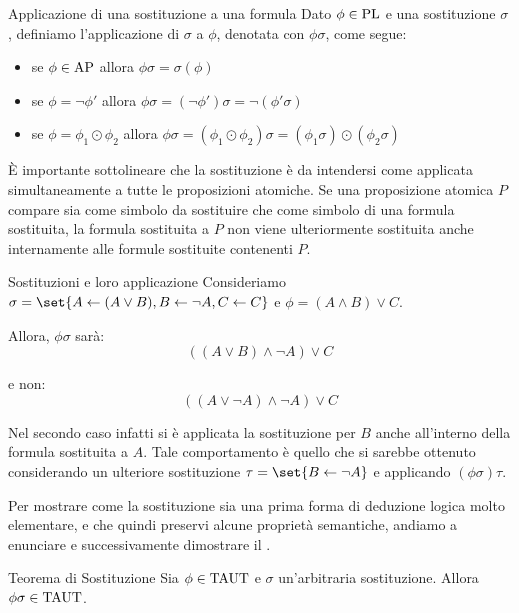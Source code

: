 \begin{definition}{Applicazione di una sostituzione a una formula}
  Dato \(\phi \in \operatorname{PL}\) e una sostituzione \(\sigma\), definiamo l'applicazione di \(\sigma\) a \(\phi\), denotata con \(\phi\sigma\), come segue:
  \begin{itemize}
   \item se \(\phi \in \AP\) allora \(\phi\sigma = \sigma(\phi)\)
   \item se \(\phi = \neg \phi'\) allora \(\phi\sigma = (\neg \phi ')\sigma = \neg (\phi'\sigma)\)
   \item se \(\phi = \phi_1 \odot \phi_2\) allora \(\phi\sigma = (\phi_1 \odot \phi_2)\sigma = (\phi_1\sigma) \odot (\phi_2\sigma)\)
  \end{itemize}
\end{definition}

\begin{note}{}
  È importante sottolineare che la sostituzione è da intendersi come applicata simultaneamente a tutte le proposizioni atomiche. Se una proposizione atomica \(P\) compare sia come simbolo da sostituire che come simbolo di una formula sostituita, la formula sostituita a \(P\) non viene ulteriormente sostituita anche internamente alle formule sostituite contenenti \(P\).
\end{note}

\begin{example}{Sostituzioni e loro applicazione}  
  Consideriamo \(\sigma = \set{A \leftarrow (A\lor B), B \leftarrow \neg A, C \leftarrow C}\) e \(\phi = (A \land B) \lor C\).
  
  Allora, \(\phi\sigma\) sarà:
  \[((A\lor B) \land \neg A) \lor C\]

  e non:
  \[((A\lor \neg A)\land \neg A)\lor C\]

  Nel secondo caso infatti si è applicata la sostituzione per \(B\) anche all'interno della formula sostituita a \(A\). Tale comportamento è quello che si sarebbe ottenuto considerando un ulteriore sostituzione \(\tau = \set{B\leftarrow \neg A}\) e applicando \((\phi\sigma)\tau\).
\end{example}

Per mostrare come la sostituzione sia una prima forma di deduzione logica molto elementare, e che quindi preservi alcune proprietà semantiche, andiamo a enunciare e successivamente dimostrare il .

\begin{theorem}[namedlabel={thm:substitution}{Teorema di Sostituzione}]{Teorema di Sostituzione}
  Sia \(\phi\in \Taut\) e \(\sigma\) un'arbitraria sostituzione. Allora \(\phi\sigma\in \Taut\).
\end{theorem}

